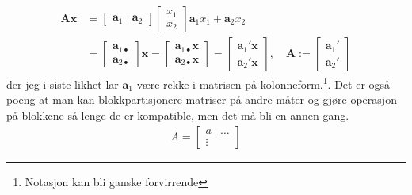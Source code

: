\begin{align}
\mathbf{A}\mathbf{x} &=
\begin{bmatrix}
\mathbf{a}_1 & \mathbf{a}_2
\end{bmatrix}
\begin{bmatrix}
x_1 \\
x_2
\end{bmatrix}
\mathbf{a}_1 x_1 + \mathbf{a}_2 x_2 \\
&=
\begin{bmatrix}
\mathbf{a}_{1\bullet}\\
 \mathbf{a}_{2\bullet}
\end{bmatrix}
\mathbf{x}
 = 
\begin{bmatrix}
\mathbf{a}_{1\bullet}\mathbf{x}\\
 \mathbf{a}_{2\bullet}\mathbf{x}
\end{bmatrix}
=
\begin{bmatrix}
\mathbf{a}_1'\mathbf{x}\\
 \mathbf{a}_{2}'\mathbf{x}
\end{bmatrix}
,\quad \mathbf{A} := 
\begin{bmatrix}
\mathbf{a}_1 ' \\
\mathbf{a}_2'
\end{bmatrix}
\end{align}
der jeg i siste likhet lar $\mathbf{a}_1$ være rekke i matrisen på kolonneform.\footnote{Notasjon kan bli ganske forvirrende}. Det er også poeng at man kan blokkpartisjonere matriser på andre måter og gjøre operasjon på blokkene så lenge de er kompatible, men det må bli en annen gang.
\begin{align}
A= \begin{bmatrix}
a &\dots \\
\vdots &
\end{bmatrix}
\end{align}
